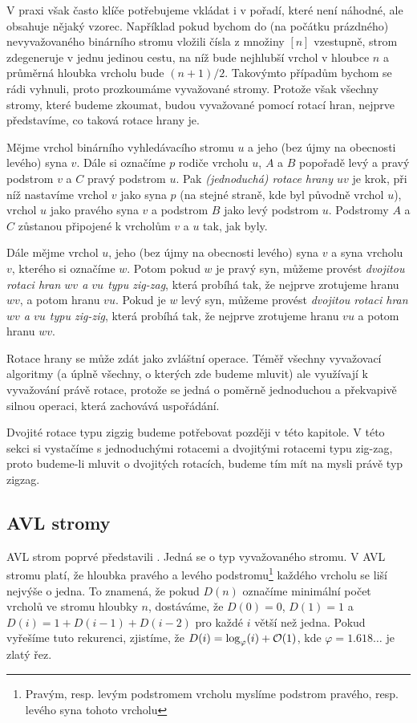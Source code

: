 V praxi však často klíče potřebujeme vkládat i v pořadí, které není náhodné,
ale obsahuje nějaký vzorec. Například pokud bychom do (na počátku prázdného)
nevyvažovaného binárního stromu vložili čísla z množiny $[n]$ vzestupně, strom
zdegeneruje v jednu jedinou cestu, na níž bude nejhlubší vrchol v hloubce $n$ a
průměrná hloubka vrcholu bude $(n+1)/2$. Takovýmto případům bychom se rádi
vyhnuli, proto prozkoumáme vyvažované stromy. Protože však všechny stromy,
které budeme zkoumat, budou vyvažované pomocí rotací hran, nejprve představíme,
co taková rotace hrany je.

\begin{definice}
Mějme vrchol binárního vyhledávacího stromu $u$ a jeho (bez újmy na obecnosti levého) syna $v$. Dále si
označíme $p$ rodiče vrcholu $u$, $A$ a $B$ popořadě levý a pravý podstrom $v$ a
$C$ pravý podstrom $u$. Pak \emph{(jednoduchá) rotace hrany $uv$} je krok,
při níž nastavíme vrchol $v$ jako syna $p$ (na stejné straně, kde byl původně
vrchol $u$), vrchol $u$ jako pravého syna $v$ a podstrom $B$ jako levý podstrom
$u$. Podstromy $A$ a $C$ zůstanou připojené k vrcholům $v$ a $u$ tak, jak byly.

Dále mějme vrchol $u$, jeho (bez újmy na obecnosti levého) syna $v$ a syna
vrcholu $v$, kterého si označíme $w$. Potom pokud $w$ je pravý syn, můžeme
provést \emph{dvojitou rotaci hran $wv$ a $vu$ typu zig-zag}, která probíhá tak,
že nejprve zrotujeme hranu $wv$, a potom hranu $vu$. Pokud je $w$ levý syn,
můžeme provést \emph{dvojitou rotaci hran $wv$ a $vu$ typu zig-zig}, která
probíhá tak, že nejprve zrotujeme hranu $vu$ a potom hranu $wv$.
\end{definice}

Rotace hrany se může zdát jako zvláštní operace. Téměř všechny vyvažovací algoritmy (a úplně všechny, o kterých zde budeme mluvit) ale využívají k vyvažování právě rotace, protože se jedná o poměrně jednoduchou a překvapivě silnou operaci, která zachovává uspořádání.

Dvojité rotace typu zigzig budeme potřebovat později v této kapitole. V této
sekci si vystačíme s jednoduchými rotacemi a dvojitými rotacemi typu zig-zag,
proto budeme-li mluvit o dvojitých rotacích, budeme tím mít na mysli právě typ
zigzag.

\subsection{AVL stromy}

AVL strom poprvé představili \citet{AVL}. Jedná se o typ vyvažovaného stromu. V
AVL stromu platí, že hloubka pravého a levého podstromu\footnote{Pravým, resp. levým podstromem vrcholu myslíme podstrom pravého, resp. levého syna tohoto vrcholu} každého vrcholu se liší
nejvýše o jedna. To znamená, že pokud $D(n)$ označíme minimální počet vrcholů
ve stromu hloubky $n$, dostáváme, že $D(0)=0$, $D(1)=1$ a
$D(i)=1+D(i-1)+D(i-2)$ pro každé $i$ větší než jedna. Pokud vyřešíme tuto
rekurenci, zjistíme, že $D(i)=\log_\varphi(i) + \mathcal O(1)$, kde $\varphi = 1.618\dots$ je zlatý
řez.

